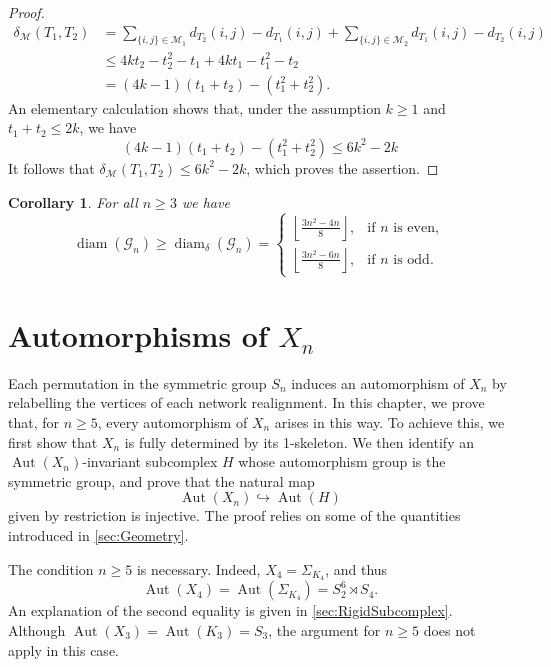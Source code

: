 \documentclass[reqno,dvipsnames]{amsart}
\theoremstyle{plain}
\newtheorem{corollary}[theorem]{Corollary}
\numberwithin{equation}{section}
\theoremstyle{definition}
\DeclareMathOperator{\Aut}{Aut}
\begin{document}
\begin{proof}
	\begin{align*}
		\delta_\mathcal{M}(T_1,T_2) &= \sum_{\{i,j\}\in\mathcal{M}_1}d_{T_2}(i,j)-d_{T_1}(i,j) + \sum_{\{i,j\}\in\mathcal{M}_2}d_{T_1}(i,j)-d_{T_2}(i,j)\\
		&\leq  4kt_2-t_2^2 - t_1 + 4kt_1-t_1^2 - t_2\\
		&= (4k-1)(t_1+t_2) - (t_1^2+t_2^2).  
	\end{align*}
	An elementary calculation shows that, under the assumption $k\geq 1$ and $t_1 + t_2 \leq 2k$, we have
	\[
	(4k-1)(t_1+t_2) - (t_1^2+t_2^2) \leq 6k^2-2k
	\]
	It follows that $\delta_\mathcal{M}(T_1,T_2)\leq 6k^2-2k$, which proves the assertion.
\end{proof}

\begin{corollary}\label{cor:lowerbound}
	For all $n\geq 3$ we have
	\[
	\operatorname{diam}(\mathcal{G}_n) \geq \operatorname{diam}_{\delta}(\mathcal{G}_n)=
	\begin{cases}
		\displaystyle
		\left\lfloor \frac{3n^2-4n}{8} \right\rfloor,
		& \text{if $n$ is even},\\[3mm]
		\displaystyle
		\left\lfloor \frac{3n^2-6n}{8} \right\rfloor,
		& \text{if $n$ is odd}.
	\end{cases}
	\]
\end{corollary}



\section{Automorphisms of \texorpdfstring{$X_n$}{Xn}}\label{sec:automorphisms}

		Each permutation in the symmetric group $S_n$ induces an automorphism of $X_n$ by relabelling the vertices of each network realignment. In this chapter, we prove that, for $n\geq 5$, every automorphism of $X_n$ arises in this way. To achieve this, we first show that $X_n$ is fully determined by its 1-skeleton. We then identify an $\Aut(X_n)$-invariant subcomplex $H$ whose automorphism group is the symmetric group, and prove that the natural map
		\[
			\Aut (X_n) \hookrightarrow \Aut(H)
		\]
		given by restriction is injective. The proof relies on some of the quantities introduced in \autoref{sec:Geometry}.

		The condition $n\geq 5$ is necessary. Indeed, $X_4 = \Sigma_{K_4}$, and thus
		\[
			\Aut(X_4) = \Aut(\Sigma_{K_4}) = S_2^6 \rtimes S_4.
		\]
		An explanation of the second equality is given in \autoref{sec:RigidSubcomplex}. Although $\Aut(X_3) = \Aut(K_3) = S_3$, the argument for $n\geq5$ does not apply in this case.
\end{document}

